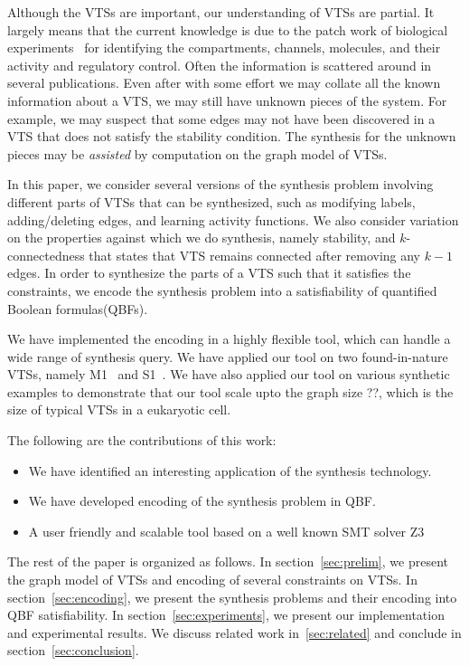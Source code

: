 %
Although the VTSs are important, our understanding of VTSs are partial.
%
It largely means that the current knowledge is due to the patch work
of biological experiments~\cite{model} for identifying the compartments,
channels, molecules, and their activity and regulatory control.
%
Often the information is scattered around in several publications.
%
Even after with some effort we may collate all the known information about
a VTS, we may still have unknown pieces of the system.
%
%
For example, we may suspect that some edges may not have been
discovered in a VTS that does not satisfy the stability condition.
%
The synthesis for the unknown pieces may be {\em assisted} by computation on
the graph model of VTSs.
%

In this paper, we consider several versions of the synthesis problem
involving different parts of VTSs that can be synthesized, such as
modifying labels, adding/deleting edges, and learning activity functions.
%
We also consider variation on the properties against which we do synthesis,
namely stability, and $k$-connectedness that states
that VTS remains connected after removing any $k-1$ edges.
%
In order to synthesize the parts of a VTS such that it satisfies the
constraints, we encode the synthesis problem into a satisfiability of
quantified Boolean formulas(QBFs). 
%

We have implemented the encoding in a highly flexible tool,
which can handle a wide range of synthesis query.
%
We have applied our tool on two found-in-nature VTSs, namely
M1~\cite{} and S1~\cite{}.
%
We have also applied our tool on various synthetic examples to
demonstrate that our tool scale upto the graph size ??, which
is the size of typical VTSs in a eukaryotic cell.

The following are the contributions of this work:
\begin{itemize}
\item We have identified an interesting application of
  the synthesis technology.
\item We have developed encoding of the synthesis problem in QBF.
\item A user friendly and scalable tool based on a well known SMT solver Z3
\end{itemize}

The rest of the paper is organized as follows.
%
In section~\ref{sec:prelim}, we present the graph model of VTSs and encoding of several
constraints on VTSs.
%
In section~\ref{sec:encoding}, we present the synthesis problems and their
encoding into QBF satisfiability.
%
In section~\ref{sec:experiments}, we present our implementation and experimental results.
%
We discuss related work in~\ref{sec:related} and conclude in section~\ref{sec:conclusion}.




